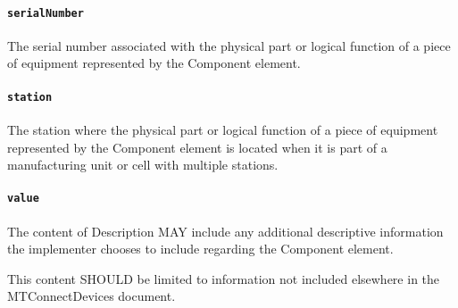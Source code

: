 \paragraph{\texttt{serialNumber}}\mbox{}
\newline\tab The serial number associated with the physical part or logical function of a piece of equipment represented by the Component element.

\paragraph{\texttt{station}}\mbox{}
\newline\tab The station where the physical part or logical function of a piece of equipment represented by the Component element is located when it is part of a manufacturing unit or cell with multiple stations.

\paragraph{\texttt{value}}\mbox{}
\newline\tab The content of Description MAY include any additional descriptive information the implementer chooses to include regarding the Component element. 

This content SHOULD be limited to information not included elsewhere in the MTConnectDevices document.
\FloatBarrier
